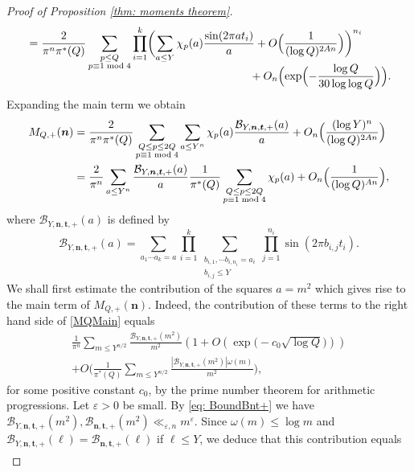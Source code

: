 \documentclass[JEP,XML,SOM,Unicode,NoFloatCountersInSection,published]{cedram}
\theoremstyle{plain}
\theoremstyle{definition}
\newcommand{\B}{\mathcal{B}}
\newcommand{\un}{\boldsymbol{n}}
\newcommand{\ut}{\boldsymbol{t}}
\begin{document}
\begin{proof}[Proof of Proposition \ref{thm: moments theorem}]
\begin{align*}
&= \frac{2}{\pi^n\pi^*(Q)}\sum_{\substack{p\leq Q\\ p\equiv 1\bmod 4}}\prod_{i=1}^k \biggl(\sum_{a\leq Y} \chi_p(a) \frac{\sin(2\pi at_i)}{a}+ O\Bigl(\frac{1}{(\log Q)^{2An}}\Bigr)\biggr)^{n_i}\\[-10pt]
& \hspace*{7cm} + O_n\Bigl(\exp\Bigl(-\frac{\log Q}{30\log\log Q}\Bigr)\Bigr).
\end{align*}
Expanding the main term we obtain
\begin{equation}\label{MQMain}
\begin{aligned}
M_{Q, +}(\un)
&= \frac{2}{\pi^n\pi^*(Q)}\sum_{\substack{Q\leq p\leq 2Q\\ p\equiv 1\bmod 4}}\sum_{a\leq Y^n}\chi_p(a) \frac{\B_{Y,\un, \ut, +}(a)}{a} +O _n\Bigl(\frac{(\log Y)^n}{(\log Q)^{2An}}\Bigr)\\
&= \frac{2}{\pi^n}\sum_{a\leq Y^n}\frac{\B_{Y,\un, \ut, +}(a)}{a} \frac{1}{\pi^*(Q)}\sum_{\substack{Q\leq p\leq 2Q\\ p\equiv 1\bmod 4}}\chi_p(a) +O_n\Bigl(\frac{1}{(\log Q)^{An}}\Bigr),
\end{aligned}
\end{equation}
where $\B_{Y,\un, \ut, +}(a)$ is defined by
\[\B_{Y,\un, \ut, +}(a)=
\sum_{a_{1}\cdots a_{k} = a} \prod_{i = 1}^k \sum_{\substack{b_{i,1}, \cdots b_{i,n_i} = a_i \\ b_{i,j} \leq Y}} \prod_{j = 1}^{n_i} \sin(2 \pi b_{i,j} t_i).\]
We shall first estimate the contribution of the squares $a=m^2$ which gives rise to the main term of $M_{Q, +}(\un)$. Indeed, the contribution of these terms to the right hand side of \eqref{MQMain} equals
\begin{multline*}
\frac{1}{\pi^n}\sum_{m\leq Y^{n/2}}\frac{\B_{Y,\un, \ut, +}(m^2)}{m^2} \left(1+O\left(\exp\bigl(-c_0\sqrt{\log Q}\bigr)\right)\right) \\
+ O\biggl(\frac{1}{\pi^*(Q)}\sum_{m\leq Y^{n/2}}\frac{|\B_{Y,\un, \ut, +}(m^2)|\omega(m)}{m^2}\biggr),
\end{multline*}
for some positive constant $c_0$, by the prime number theorem for arithmetic progressions.
Let $\varepsilon>0$ be small. By \eqref{eq: BoundBnt+} we have $\B_{Y,\un, \ut, +}(m^2), \B_{\un, \ut, +}(m^2)\ll_{\varepsilon, n} m^{\varepsilon}$. Since $\omega(m)\leq \log m$ and $\B_{Y,\un, \ut, +}(\ell)= \B_{\un, \ut, +}(\ell)$ if $\ell\leq Y$, we deduce that this contribution equals
\begin{equation}\label{SquaresContrib}
\begin{aligned}

\end{aligned}
\end{equation}
\end{proof}
\end{document}
